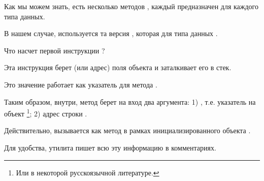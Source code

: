 Как мы можем знать, есть несколько методов , каждый предназначен для каждого типа
данных.

В нашем случае, используется та версия , которая для типа данных .


Что насчет первой инструкции ?

Эта инструкция берет  (или адрес) поля объекта 
и заталкивает его в стек.

Это значение работает как указатель  для метода .

Таким образом, внутри, метод  берет на вход два аргумента:
1) , т.е. указатель на объект
\footnote{Или  в некоторой русскоязычной литературе.};
2) адрес строки .


Действительно,  вызывается как метод в рамках инициализированного объекта 
.


Для удобства, утилита  пишет всю эту информацию в комментариях.
